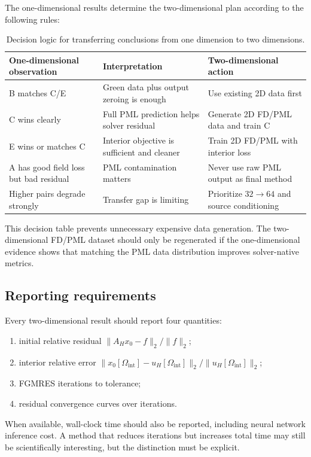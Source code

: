 The one-dimensional results determine the two-dimensional plan according to
the following rules:
\begin{table}[h]
\centering
\begin{tabular}{lll}
\toprule
One-dimensional observation & Interpretation & Two-dimensional action \\
\midrule
B matches C/E &
Green data plus output zeroing is enough &
Use existing 2D data first \\
C wins clearly &
Full PML prediction helps solver residual &
Generate 2D FD/PML data and train C \\
E wins or matches C &
Interior objective is sufficient and cleaner &
Train 2D FD/PML with interior loss \\
A has good field loss but bad residual &
PML contamination matters &
Never use raw PML output as final method \\
Higher pairs degrade strongly &
Transfer gap is limiting &
Prioritize $32\to64$ and source conditioning \\
\bottomrule
\end{tabular}
\caption{Decision logic for transferring conclusions from one dimension to
two dimensions.}
\label{tab:twod_decision_logic}
\end{table}

This decision table prevents unnecessary expensive data generation. The
two-dimensional FD/PML dataset should only be regenerated if the one-dimensional
evidence shows that matching the PML data distribution improves solver-native
metrics.


\subsection{Reporting requirements}
\label{subsec:methodology_2d_reporting}

Every two-dimensional result should report four quantities:
\begin{enumerate}
    \item initial relative residual $\|A_H x_0 - f\|_2/\|f\|_2$;
    \item interior relative error
    $\|x_0[\Omega_{\mathrm{int}}]-u_H[\Omega_{\mathrm{int}}]\|_2/
      \|u_H[\Omega_{\mathrm{int}}]\|_2$;
    \item FGMRES iterations to tolerance;
    \item residual convergence curves over iterations.
\end{enumerate}
When available, wall-clock time should also be reported, including neural
network inference cost. A method that reduces iterations but increases total
time may still be scientifically interesting, but the distinction must be
explicit.

